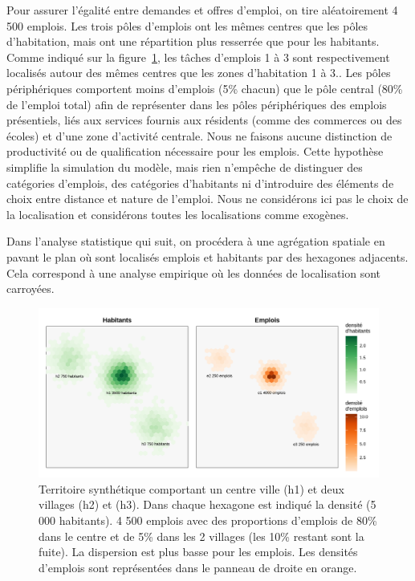 \documentclass[
  10pt,
  a4paper,
  numbers=noendperiod,
  DIV=12]{scrartcl}
\begin{document}
Pour assurer l'égalité entre demandes et offres d'emploi, on tire
aléatoirement 4 500 emplois. Les trois pôles d'emplois ont les mêmes
centres que les pôles d'habitation, mais ont une répartition plus
resserrée que pour les habitants. Comme indiqué sur la
figure~\ref{fig-territoire}, les tâches d'emplois 1 à 3 sont
respectivement localisés autour des mêmes centres que les zones
d'habitation 1 à 3.. Les pôles périphériques comportent moins d'emplois
(5\% chacun) que le pôle central (80\% de l'emploi total) afin de
représenter dans les pôles périphériques des emplois présentiels, liés
aux services fournis aux résidents (comme des commerces ou des écoles)
et d'une zone d'activité centrale. Nous ne faisons aucune distinction de
productivité ou de qualification nécessaire pour les emplois. Cette
hypothèse simplifie la simulation du modèle, mais rien n'empêche de
distinguer des catégories d'emplois, des catégories d'habitants ni
d'introduire des éléments de choix entre distance et nature de l'emploi.
Nous ne considérons ici pas le choix de la localisation et considérons
toutes les localisations comme exogènes.

Dans l'analyse statistique qui suit, on procédera à une agrégation
spatiale en pavant le plan où sont localisés emplois et habitants par
des hexagones adjacents. Cela correspond à une analyse empirique où les
données de localisation sont carroyées.

\begin{figure}[htb]

{\centering \includegraphics[width=1\textwidth,height=\textheight]{svg/gcarte_ss.png}

}

\caption[Territoire synthétique (centre + 2
villages)]{\label{fig-territoire}Territoire synthétique comportant un
centre ville (h1) et deux villages (h2) et (h3). Dans chaque hexagone
est indiqué la densité (5 000 habitants). 4 500 emplois avec des
proportions d'emplois de 80\% dans le centre et de 5\% dans les 2
villages (les 10\% restant sont la fuite). La dispersion est plus basse
pour les emplois. Les densités d'emplois sont représentées dans le
panneau de droite en orange.}

\end{figure}
\end{document}
